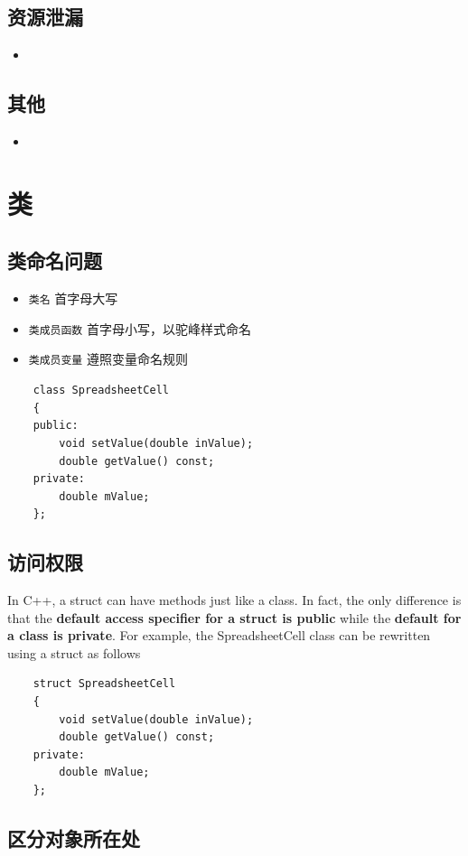 \documentclass[UTF8,a4paper,12pt]{ctexbook} %
\begin{document}
		\subsection{资源泄漏}
			\begin{itemize}
				\item 
			\end{itemize}
		\subsection{其他}
			\begin{itemize}
				\item 
			\end{itemize}
		
\section{类}
	\subsection{类命名问题}
		\begin{itemize}
			\item  \verb|类名| 首字母大写
			\item  \verb|类成员函数| 首字母小写，以驼峰样式命名
			\item  \verb|类成员变量| 遵照变量命名规则
		\end{itemize}
		
		\begin{lstlisting}
	class SpreadsheetCell
	{
	public:
		void setValue(double inValue);
		double getValue() const;
	private:
		double mValue;
	};
		\end{lstlisting}

	\subsection{访问权限}
		In C++, a struct can have methods just like a class. In fact, the only difference is that the \textbf{default
		access specifier for a struct is public} while the \textbf{default for a class is private}. For example, the
		SpreadsheetCell class can be rewritten using a struct as follows
		
		\begin{lstlisting}
	struct SpreadsheetCell
	{
		void setValue(double inValue);
		double getValue() const;
	private:
		double mValue;
	};
		\end{lstlisting}
	
	\subsection{区分对象所在处}
\end{document}
